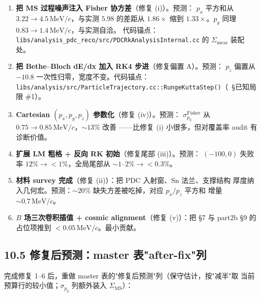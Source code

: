 \begin{enumerate}
  \item \textbf{把 MS 过程噪声注入 Fisher 协方差}（修复 (i)）。预测：
        $p_x$ 平方和从 $3.22\to 4.5\,\mathrm{MeV}/c$，与实测 $5.98$ 的差距从 $1.86\times$
        缩到 $1.33\times$。$p_y$ 同理 $0.83\to 1.4\,\mathrm{MeV}/c$，与实测自洽。
        代码锚点：\texttt{libs/analysis\_pdc\_reco/src/PDCRkAnalysisInternal.cc} 的
        $\Sigma_\mathrm{meas}$ 装配处。%
  \item \textbf{把 Bethe--Bloch dE/dx 加入 RK4 步进}（修复偏置 A）。预测：
        $p_z$ 偏置从 $-10.8$ 一次性归零，宽度不变。代码锚点：
        \texttt{libs/analysis/src/ParticleTrajectory.cc::RungeKuttaStep()}（\StatusReport{}~§已知局限 \#1）。%
  \item \textbf{Cartesian $(p_x,p_y,p_z)$ 参数化}（修复 (iv)）。预测：
        $\sigma_{p_y}^\mathrm{Fisher}$ 从 $0.75 \to 0.85\,\mathrm{MeV}/c$，$\sim 13\%$ 改善
        ——比修复 (i) 小很多，但对覆盖率 audit 有诊断价值。%
  \item \textbf{扩展 LM 粗格 + 反向 RK 初始}（修复尾部 (iii)）。预测：
        $(-100, 0)$ 失败率 $12\% \to <1\%$，全局尾部从 $\sim 1\text{--}2\% \to <0.3\%$。%
  \item \textbf{材料 survey 完成}（修复 (ii)）：把 PDC 入射窗、Sn 法兰、支撑结构
        厚度纳入几何宏。预测：$\sim 20\%$ 缺失方差被吃掉，对应 $p_x/p_z$ 平方和
        增量 $\sim 0.7\,\mathrm{MeV}/c$。%
  \item \textbf{$B$ 场三次卷积插值 + cosmic alignment}（修复 (v)）：把 §7 与 part2b §9
        的占位项推到 $<0.05\,\mathrm{MeV}/c$。最小贡献。
\end{enumerate}

\subsection*{10.5 修复后预测：master 表"after-fix"列}

完成修复 1--6 后，重做 master 表的"修复后预测"列（保守估计，按"减半"取
当前预算行的较小值；$\sigma_{p_y}$ 列额外装入 $\Sigma_\mathrm{MS}$）：

